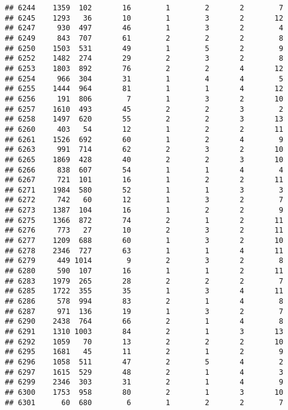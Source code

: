 \documentclass[]{article}
\begin{document}
\begin{verbatim}
## 6244    1359  102       16        1        2       2        7
## 6245    1293   36       10        1        3       2       12
## 6247     930  497       46        1        3       2        4
## 6249     843  707       61        2        2       2        8
## 6250    1503  531       49        1        5       2        9
## 6252    1482  274       29        2        3       2        8
## 6253    1803  892       76        2        2       4       12
## 6254     966  304       31        1        4       4        5
## 6255    1444  964       81        1        1       4       12
## 6256     191  806        7        1        3       2       10
## 6257    1610  493       45        2        2       3        2
## 6258    1497  620       55        2        2       3       13
## 6260     403   54       12        1        2       2       11
## 6261    1526  692       60        1        2       4        9
## 6263     991  714       62        2        3       2       10
## 6265    1869  428       40        2        2       3       10
## 6266     838  607       54        1        1       4        4
## 6267     721  101       16        1        2       2       11
## 6271    1984  580       52        1        1       3        3
## 6272     742   60       12        1        3       2        7
## 6273    1387  104       16        1        2       2        9
## 6275    1366  872       74        2        1       2       11
## 6276     773   27       10        2        3       2       11
## 6277    1209  688       60        1        3       2       10
## 6278    2346  727       63        1        1       4       11
## 6279     449 1014        9        2        3       2        8
## 6280     590  107       16        1        1       2       11
## 6283    1979  265       28        2        2       2        7
## 6285    1722  355       35        1        3       4       11
## 6286     578  994       83        2        1       4        8
## 6287     971  136       19        1        3       2        7
## 6290    2438  764       66        2        1       4        8
## 6291    1310 1003       84        2        1       3       13
## 6292    1059   70       13        2        2       2       10
## 6295    1681   45       11        2        1       2        9
## 6296    1058  511       47        2        5       4        2
## 6297    1615  529       48        2        1       4        3
## 6299    2346  303       31        2        1       4        9
## 6300    1753  958       80        2        1       3       10
## 6301      60  680        6        1        2       2        7

\end{verbatim}
\end{document}
